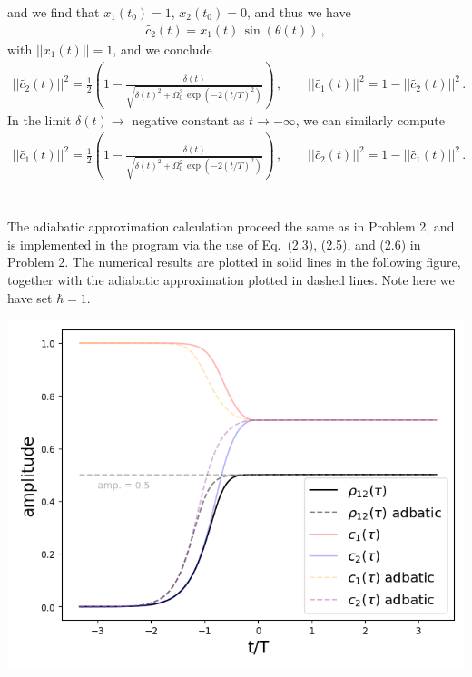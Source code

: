 \documentclass[11pt, oneside]{book}
\theoremstyle{break}
\theoremstyle{break}
\newcommand{\that}[1]{\widetilde{#1}}
\begin{document}
and we find that $x_1(t_0) = 1$, $x_2(t_0) = 0$, and thus we have
\begin{align*}
\that{c_2}(t) = x_1(t)\, \sin(\theta(t))\,,
\end{align*}
with $||x_1(t)|| = 1$, and we conclude
\begin{align*}
||\that{c_2}(t)||^2 = \frac{1}{2}\left( 1 - \frac{\delta(t)}{\sqrt{\delta(t)^2 + \Omega_0^2\,\exp(-2(t/T)^2)} }\right)\,,\qquad
||\that{c_1}(t)||^2 = 1- ||\that{c_2}(t)||^2\,.
\end{align*}
In the limit $\delta(t) \to $ negative constant as $t \to -\infty$, we can similarly compute
\begin{align*}
||\that{c_1}(t)||^2 = \frac{1}{2}\left( 1 - \frac{\delta(t)}{\sqrt{\delta(t)^2 + \Omega_0^2\,\exp(-2(t/T)^2)} }\right)\,,\qquad
||\that{c_2}(t)||^2 = 1- ||\that{c_1}(t)||^2\,.
\end{align*}



\chapter{}
The adiabatic approximation calculation proceed the same as in Problem 2, and is implemented in the program via the use of Eq.\ (2.3), (2.5), and (2.6) in Problem 2. The numerical results are plotted in solid lines in the following figure, together with the adiabatic approximation plotted in dashed lines. Note here we have set $\hbar = 1$.\\

\begin{center}
\includegraphics[scale=0.8]{542HW1/P3}
\end{center}
\end{document}
